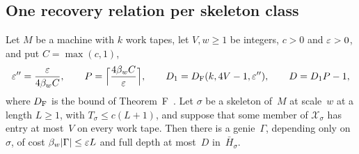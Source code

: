 \subsection{One recovery relation per skeleton class}\label{sec:skel-class}

\begin{lemma}\label{lem:skel-genie}
Let $M$ be a machine with $k$ work tapes, let $V,w\ge1$ be integers, $c>0$ and $\varepsilon>0$, and put $C=\max(c,1)$,
\[
  \varepsilon''=\frac{\varepsilon}{4\beta_wC},\qquad P=\Bigl\lceil\frac{4\beta_wC}{\varepsilon}\Bigr\rceil,\qquad
  D_1=D_{\mathrm F}(k,4V-1,\varepsilon''),\qquad D=D_1P-1,
\]
where $D_{\mathrm F}$ is the bound of Theorem~F~\cite[Theorem~3.6]{BoundedNesting2026}. Let $\sigma$ be a skeleton of~$M$ at
scale~$w$ at a length $L\ge1$, with $T_\sigma\le c(L+1)$, and suppose that some member of $\mathcal X_\sigma$ has entry
at most~$V$ on every work tape. Then there is a genie~$\Gamma$, depending only on~$\sigma$, of cost
$\beta_w\lvert \Gamma \rvert\le\varepsilon L$ and full depth at most~$D$ in~$\bar H_\sigma$.
\end{lemma}

